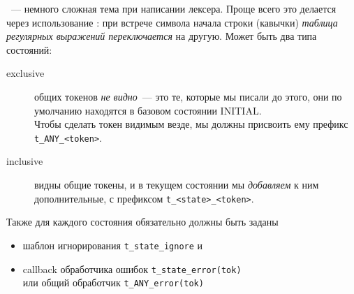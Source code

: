 \clearpage
{}
\ --- немного сложная тема при написании лексера. Проще всего
это делается через использование : при встрече символа начала
строки (кавычки) \emph{таблица регулярных выражений переключается} на другую.
Может быть два типа состояний:

\begin{description}
\item[exclusive] общих токенов \emph{не видно}\ --- это те, которые мы писали до
этого, они по умолчанию находятся в базовом состоянии INITIAL.\\
Чтобы сделать токен видимым везде, мы должны присвоить ему префикс
\verb|t_ANY_<token>|.
\item[inclusive] видны общие токены, и в текущем состоянии мы \emph{добавляем} к
ним дополнительные, с префиксом \verb|t_<state>_<token>|.
\end{description}

\clearpage
Также для каждого состояния обязательно должны быть заданы
\begin{itemize}
  \item 
 шаблон игнорирования \verb|t_state_ignore| и
  \item 
 callback обработчика ошибок \verb|t_state_error(tok)|\\
 или общий обработчик \verb|t_ANY_error(tok)|
\end{itemize}
\clearpage
{}
 
\secup